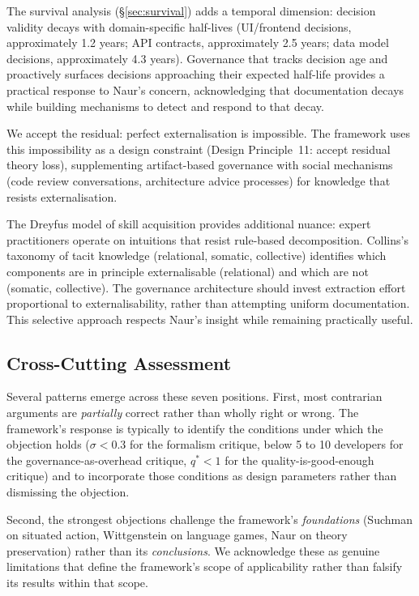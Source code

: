 The survival analysis (\S\ref{sec:survival}) adds a temporal dimension: decision validity decays with domain-specific half-lives (UI/frontend decisions, approximately 1.2 years; API contracts, approximately 2.5 years; data model decisions, approximately 4.3 years). Governance that tracks decision age and proactively surfaces decisions approaching their expected half-life provides a practical response to Naur's concern, acknowledging that documentation decays while building mechanisms to detect and respond to that decay.

We accept the residual: perfect externalisation is impossible. The framework uses this impossibility as a design constraint (Design Principle~11: accept residual theory loss), supplementing artifact-based governance with social mechanisms (code review conversations, architecture advice processes) for knowledge that resists externalisation.

The Dreyfus model of skill acquisition provides additional nuance: expert
practitioners operate on intuitions that resist rule-based decomposition.
Collins's taxonomy of tacit knowledge (relational, somatic, collective)
identifies which components are in principle externalisable (relational) and
which are not (somatic, collective).  The governance architecture should invest
extraction effort proportional to externalisability, rather than attempting
uniform documentation.  This selective approach respects Naur's insight while
remaining practically useful.


\subsection{Cross-Cutting Assessment}

Several patterns emerge across these seven positions.  First, most contrarian
arguments are \emph{partially} correct rather than wholly right or wrong.  The
framework's response is typically to identify the conditions under which the
objection holds ($\sigma < 0.3$ for the formalism critique, below 5 to 10
developers for the governance-as-overhead critique, $q^* < 1$ for the
quality-is-good-enough critique) and to incorporate those conditions as design
parameters rather than dismissing the objection.

Second, the strongest objections challenge the framework's \emph{foundations}
(Suchman on situated action, Wittgenstein on language games, Naur on
theory preservation) rather than its \emph{conclusions}.  We acknowledge these
as genuine limitations that define the framework's scope of applicability rather
than falsify its results within that scope.

